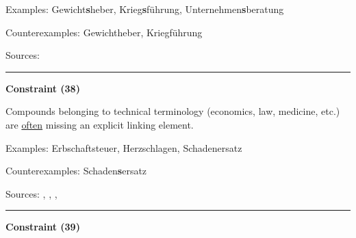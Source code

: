 \noindent
Examples: Gewicht\textbf{s}heber, Krieg\textbf{s}führung, Unternehmen\textbf{s}beratung

\noindent
Counterexamples: Gewicht{\zeroLinker}heber, Krieg{\zeroLinker}führung

\vspace{0.3em}

\noindent
Sources: \citet[79]{nuebling_szczepaniak_2013}


\hrule




\vspace{0.4em}

\begin{center}
\textbf{Constraint (38)}
\end{center}

\noindent
Compounds belonging to technical terminology (economics, law, medicine, etc.) are \underline{often} missing an explicit linking element.
\vspace{0.35em}


\vspace{0.3em}

\noindent
Examples: Erbschaft{\zeroLinker}steuer, Herz{\zeroLinker}schlagen, Schaden{\zeroLinker}ersatz

\noindent
Counterexamples: Schaden\textbf{s}ersatz

\vspace{0.3em}

\noindent
Sources: \citet[11]{nuebling_szczepaniak_2008}, \citet[98]{ortner_mueller-bollhagen_1991}, \citet[20]{schluecker_2023}, \citet[177]{wegener_2005}


\hrule




\vspace{0.4em}

\begin{center}
\textbf{Constraint (39)}
\end{center}

